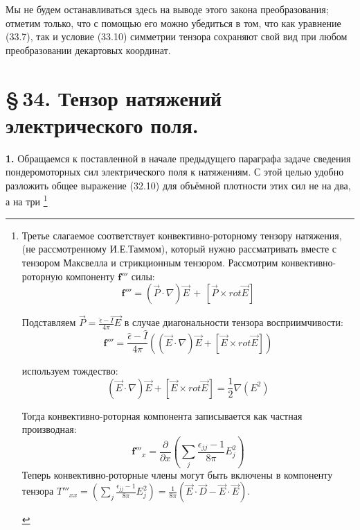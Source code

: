 \documentclass[a4paper,10pt]{article}
\newcommand{\redtext}[1]{\textcolor{redcolor}{#1}}
\newcommand{\modtext}[1]{\textcolor{modcolor}{#1}}
\newcommand{\modblock}[1]{\colorbox{modcolor!10}{\parbox{\dimexpr\linewidth-2\fboxsep}{#1}}}
\begin{document}
Мы не будем останавливаться здесь на выводе этого закона
преобразования; отметим только, что с помощью его можно убедиться
в том, что как уравнение (33.7), так и условие (33.10) симметрии
тензора сохраняют свой вид при любом преобразовании декартовых
координат.

\section*{\S\,34. Тензор натяжений электрического поля.}

\textbf{1.} Обращаемся к поставленной в начале предыдущего параграфа
задаче сведения пондеромоторных сил электрического поля к натяжениям.
С этой целью удобно разложить общее выражение (32.10) для объёмной
плотности этих сил \modtext{не} \redtext{на два}, \modtext{а на три}
\footnote{
\modblock{
Третье слагаемое соответствует конвективно-роторному тензору натяжения, (не рассмотренному И.Е.Таммом), который нужно рассматривать вместе с тензором Максвелла и стрикционным тензором. Рассмотрим конвективно-роторную компоненту ${\mathbf{f}'''}$ силы:
\begin{equation}
{\mathbf{f}'''} = (\vec{P}\cdot\nabla)\vec E\,+\, \left[\vec{P} \times rot \vec{E}\right]
\end{equation}

Подставляем $\vec{P} = \frac{\hat{\epsilon}-\hat{I}}{4\pi}\vec{E}$ в случае диагональности тензора восприимчивости:
\begin{equation}
{\mathbf{f}'''} =  \frac{\hat{\epsilon}-\hat{I}}{4\pi}\left((\vec{E}\cdot\nabla)\vec E + \left[\vec{E} \times rot \vec{E}\right]\right)
\end{equation}

используем тождество:
\begin{equation}
(\vec{E}\cdot\nabla)\vec E + \left[\vec{E} \times rot \vec{E}\right] = \frac{1}{2}\nabla(E^2)
\label{eq:derivative_identity}
\end{equation}

Тогда конвективно-роторная компонента записывается как частная производная:
\begin{equation}
{\mathbf{f}'''}_x = \frac{\partial}{\partial x}\left(\sum_j\frac{\epsilon_{jj}-1}{8\pi}E_j^2\right)
\label{eq:convective_as_derivative}
\end{equation}
Теперь конвективно-роторные члены могут быть включены в компоненту тензора $T'''_{xx}=\left(\sum_j\frac{\epsilon_{jj}-1}{8\pi}E_j^2\right) = \frac{1}{8\pi}\left(\vec E \cdot \vec D - \vec E \cdot \vec E\right)$.

}%
}%
\end{document}
